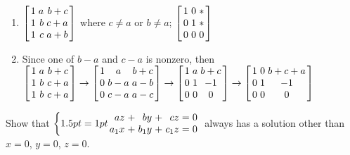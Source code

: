 \begin{multicols}{2}
\begin{ex}
\begin{enumerate}[label={\alph*.}]
\item
$\leftB \begin{array}{rrr}
1 & a & b + c \\
1 & b & c + a \\
1 & c & a + b
\end{array} \rightB$ where $c \neq a$ or $b \neq a$; 
$\leftB \begin{array}{rrr}
1 & 0 & * \\
0 & 1 & * \\
0 & 0 & 0 
\end{array} \rightB$
\end{enumerate}

\begin{sol}
\begin{enumerate}[label={\alph*.}]
\setcounter{enumi}{1}
\item Since one of $b-a$ and $c-a$ is nonzero, then
$\leftB \begin{array}{ccc}
	1 & a & b + c \\
	1 & b & c + a \\
	1 & b & c + a
\end{array} \rightB
\rightarrow
\leftB \begin{array}{ccc}
	1 & a & b + c \\
	0 & b - a & a - b \\
	0 & c - a & a - c 
\end{array} \rightB \rightarrow
\leftB \begin{array}{ccc}
	1 & a & b + c \\
	0 & 1 & -1 \\
	0 & 0 & 0 
\end{array} \rightB
\rightarrow
\leftB \begin{array}{ccc}
	1 & 0 & b + c + a\\
	0 & 1 & -1 \\
	0 & 0 & 0 
\end{array} \rightB$
\end{enumerate}
\end{sol}
\end{ex}

\begin{ex}
Show that 
$\left \{
\arraycolsep=1pt
\begin{array}{rlrlrcr}
	  az & + &   by & + &   cz & = & 0 \\
	a_1x & + & b_1y & + & c_1z & = & 0
\end{array}
\right.$ always has a solution other than $x = 0$, $y = 0$, $z = 0$.
\end{ex}



\end{multicols}
